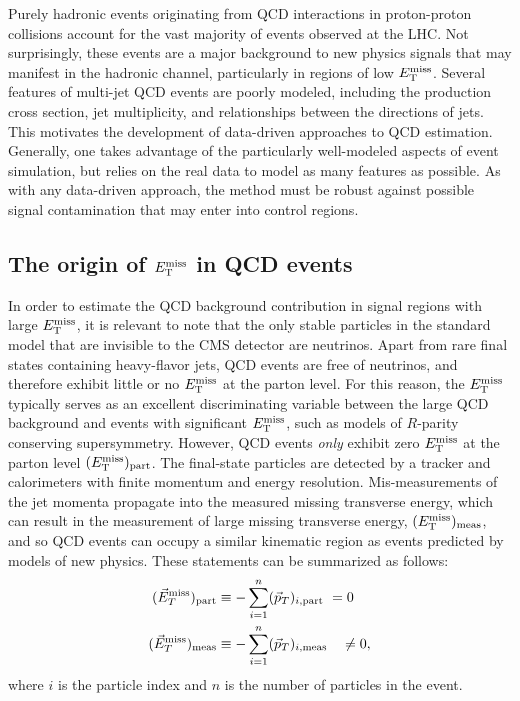 
Purely hadronic events originating from QCD interactions in proton-proton collisions account for the vast majority of events observed at the LHC. Not surprisingly, these events are a major background to new physics signals that may manifest in the hadronic channel, particularly in regions of low $E_{\text{T}}^{\rm miss}$. Several features of multi-jet QCD events are poorly modeled, including the production cross section, jet multiplicity, and relationships between the directions of jets. This motivates the development of data-driven approaches to QCD estimation. Generally, one takes advantage of the particularly well-modeled aspects of event simulation, but relies on the real data to model as many features as possible. As with any data-driven approach, the method must be robust against possible signal contamination that may enter into control regions. 

\subsection{The origin of $E_{\text{T}}^{\rm miss}$ in QCD events}
In order to estimate the QCD background contribution in signal regions with large $E_{\text{T}}^{\rm miss}$, it is relevant to note that the only stable particles in the standard model that are invisible to the CMS detector are neutrinos. Apart from rare final states containing heavy-flavor jets,  QCD events are free of neutrinos, and therefore exhibit little or no $E_{\text{T}}^{\rm miss}$ at the parton level.  For this reason, the $E_{\text{T}}^{\rm miss}$ typically serves as an excellent discriminating variable between the large QCD background and events with significant $E_{\text{T}}^{\rm miss}$, such as models of $R$-parity conserving supersymmetry. However, QCD events {\it only} exhibit zero $E_{\text{T}}^{\rm miss}$ at the parton level $(E_{\text{T}}^{\rm miss})_{\rm part}$. The final-state particles are detected by a tracker and calorimeters with finite momentum and energy resolution. Mis-measurements of the jet momenta propagate into the measured missing transverse energy, which can result in the measurement of large missing transverse energy, $(E_{\text{T}}^{\rm miss})_{\rm meas}$, and so QCD events can occupy a similar kinematic region as events predicted by models of new physics.  These statements can be summarized as follows:
\begin{align}
(\vec{E}_{ T}^{\rm miss})_{\rm part} &\equiv -\sum_{i=1}^{n}(\vec{p}_{T})_{i,\rm part\ }=0\\
(\vec{E}_{ T}^{\rm miss})_{\rm meas} &\equiv -\sum_{i=1}^{n}(\vec{p}_{T})_{i,\rm meas\ \ \ }\neq 0,
\label{eq:metTrue}
\end{align}
where $i$ is the particle index and $n$ is the number of particles in the event.

